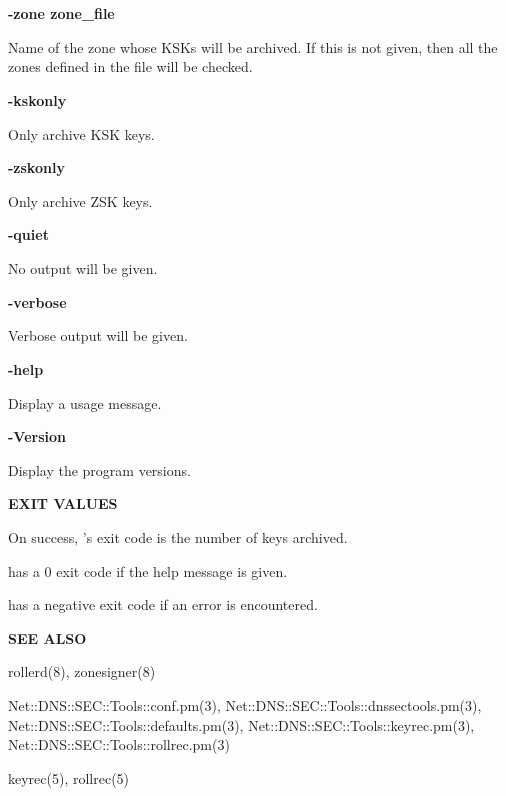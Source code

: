 \begin{description}

\item {\bf -zone zone\_file}\verb" "

Name of the zone whose KSKs will be archived.  If this is not given, then
all the zones defined in the  file will be checked.

\item {\bf -kskonly}\verb" "

Only archive KSK keys.

\item {\bf -zskonly}\verb" "

Only archive ZSK keys.

\item {\bf -quiet}\verb" "

No output will be given.

\item {\bf -verbose}\verb" "

Verbose output will be given.

\item {\bf -help}\verb" "

Display a usage message.

\item {\bf -Version}\verb" "

Display the program versions.

\end{description}

{\bf EXIT VALUES}

On success, 's exit code is the number of keys archived.

 has a 0 exit code if the help message is given.

 has a negative exit code if an error is encountered.

{\bf SEE ALSO}

rollerd(8),
zonesigner(8)

Net::DNS::SEC::Tools::conf.pm(3),
Net::DNS::SEC::Tools::dnssectools.pm(3), \\
Net::DNS::SEC::Tools::defaults.pm(3),
Net::DNS::SEC::Tools::keyrec.pm(3), \\
Net::DNS::SEC::Tools::rollrec.pm(3)

keyrec(5),
rollrec(5)

